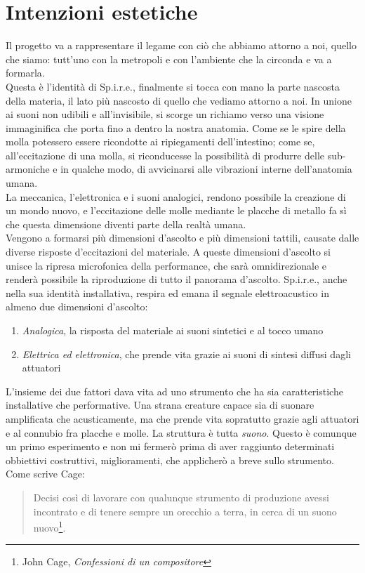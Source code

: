 \section{Intenzioni estetiche}
Il progetto va a rappresentare il legame con ciò che abbiamo attorno a noi, quello che siamo: tutt'uno con la metropoli e con l'ambiente che la circonda e va a formarla. \\
Questa è l'identità di Sp.i.r.e., finalmente si tocca con mano la parte nascosta della materia, il lato più nascosto di quello che vediamo attorno a noi. In unione ai suoni non udibili e all'invisibile, si scorge un richiamo verso una visione immaginifica che porta fino a dentro la nostra anatomia. Come se le spire della molla potessero essere ricondotte ai ripiegamenti dell'intestino; come se, all'eccitazione di una molla, si riconducesse la possibilità di produrre delle sub-armoniche e in qualche modo, di avvicinarsi alle vibrazioni interne dell'anatomia umana.\\
La meccanica, l'elettronica e i suoni analogici, rendono possibile la creazione di un mondo nuovo, e l'eccitazione delle molle mediante le placche di metallo fa sì che questa dimensione diventi parte della realtà umana. \\
Vengono a formarsi più dimensioni d'ascolto e più dimensioni tattili, causate dalle diverse risposte d'eccitazioni del materiale. A queste dimensioni d'ascolto si unisce la ripresa microfonica della performance, che sarà omnidirezionale e renderà possibile la riproduzione di tutto il panorama d'ascolto. Sp.i.r.e., anche nella sua identità installativa, respira ed emana il segnale elettroacustico in almeno due dimensioni d'ascolto:
\begin{enumerate} 
\item{\textit{Analogica}, la risposta del materiale ai suoni sintetici e al tocco umano}
\item{\textit{Elettrica ed elettronica}, che prende vita grazie ai suoni di sintesi diffusi dagli attuatori}
\end{enumerate}

L'insieme dei due fattori dava vita ad uno strumento che ha sia caratteristiche installative che performative. Una strana creature capace sia di suonare amplificata che acusticamente, ma che prende vita sopratutto grazie agli attuatori e al connubio fra placche e molle. La struttura è tutta \textit{suono}. Questo è comunque un primo esperimento e non mi fermerò prima di aver raggiunto determinati obbiettivi costruttivi, miglioramenti, che applicherò a breve sullo strumento. Come scrive Cage:
\begin{small}
\begin{quotation}
Decisi così di lavorare con qualunque strumento di produzione avessi incontrato e di tenere sempre un orecchio a terra, in cerca di un suono nuovo\footnote{John Cage, \textit{Confessioni di un compositore}}.
\end{quotation}
\end{small}
